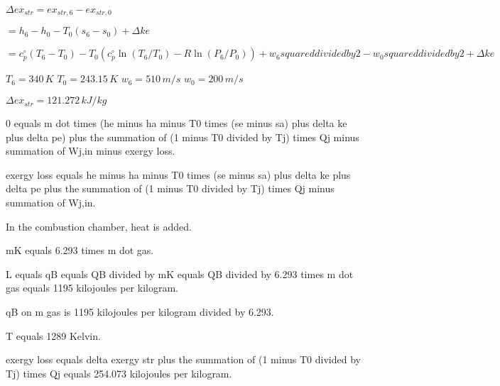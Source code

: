 \( \Delta ex_{str} = ex_{str,6} - ex_{str,0} \)  

\( = h_6 - h_0 - T_0 (s_6 - s_0) + \Delta ke \)  

\( = c_p^{\circ} (T_6 - T_0) - T_0 (c_p^{\circ} \ln(T_6/T_0) - R \ln(P_6/P_0)) + w_6 squared divided by 2 - w_0 squared divided by 2 + \Delta ke \)  

\( T_6 = 340 \, K \)  
\( T_0 = 243.15 \, K \)  
\( w_6 = 510 \, m/s \)  
\( w_0 = 200 \, m/s \)  

\( \Delta ex_{str} = 121.272 \, kJ/kg \)

0 equals m dot times (he minus ha minus T0 times (se minus sa) plus delta ke plus delta pe) plus the summation of (1 minus T0 divided by Tj) times Qj minus summation of Wj,in minus exergy loss.  

exergy loss equals he minus ha minus T0 times (se minus sa) plus delta ke plus delta pe plus the summation of (1 minus T0 divided by Tj) times Qj minus summation of Wj,in.  

In the combustion chamber, heat is added.  

mK equals 6.293 times m dot gas.  

L equals qB equals QB divided by mK equals QB divided by 6.293 times m dot gas equals 1195 kilojoules per kilogram.  

qB on m gas is 1195 kilojoules per kilogram divided by 6.293.  

T equals 1289 Kelvin.  

exergy loss equals delta exergy str plus the summation of (1 minus T0 divided by Tj) times Qj equals 254.073 kilojoules per kilogram.